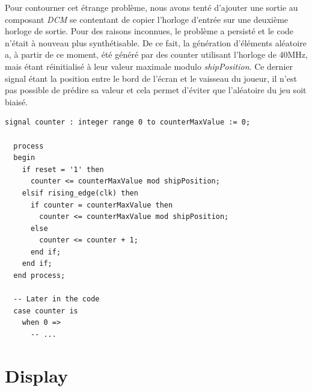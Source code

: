 \documentclass[french]{nakrule}
\begin{document}
Pour contourner cet étrange problème, nous avons tenté d'ajouter une sortie au
composant \emph{DCM} se contentant de copier l'horloge d'entrée sur une deuxième
horloge de sortie. Pour des raisons inconnues, le problème a persisté et le code
n'était à nouveau plus synthétisable. De ce fait, la génération d'éléments
aléatoire a, à partir de ce moment, été généré par des counter utilisant
l'horloge de 40MHz, mais étant réinitialisé à leur valeur maximale modulo
\emph{shipPosition}. Ce dernier signal étant la position entre le bord de
l'écran et le vaisseau du joueur, il n'est pas possible de prédire sa valeur et
cela permet d'éviter que l'aléatoire du jeu soit biaisé.

\begin{lstlisting}[style=vhdl, caption=Génération d'aléatoire]
  signal counter : integer range 0 to counterMaxValue := 0;
  
  process
  begin
    if reset = '1' then
      counter <= counterMaxValue mod shipPosition;
    elsif rising_edge(clk) then
      if counter = counterMaxValue then
        counter <= counterMaxValue mod shipPosition;
      else
        counter <= counter + 1;
      end if;
    end if;
  end process;

  -- Later in the code
  case counter is
    when 0 =>
      -- ...
\end{lstlisting}

\clearpage

\section{Display}
\label{sec:display}
\end{document}
